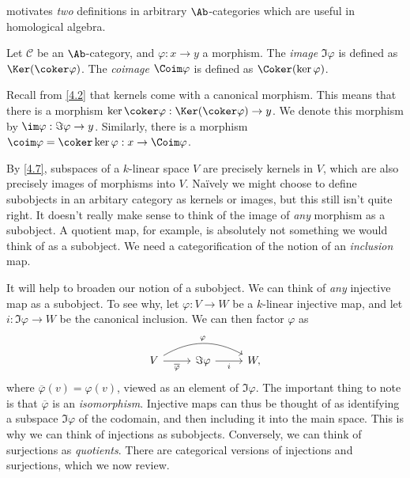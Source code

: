  motivates \emph{two} definitions in arbitrary $\Ab $-categories which are useful in homological algebra.

\begin{definition}\label{4.8}
	Let $\mathcal{C} $ be an $\Ab $-category, and $\varphi : x \to y$ a morphism. The \emph{image} $\Im \varphi $ is defined as $\Ker (\coker \varphi )$. The \emph{coimage} $\Coim \varphi $ is defined as $\Coker(\ker \varphi )$.
\end{definition}

\begin{remark}\label{4.9}
	Recall from \cref{4.2} that kernels come with a canonical morphism. This means that there is a morphism $\ker \coker \varphi : \Ker (\coker \varphi ) \to y$. We denote this morphism by $\im \varphi : \Im \varphi  \to y$. Similarly, there is a morphism $\coim \varphi =\coker \ker \varphi : x \to \Coim \varphi $.
\end{remark}

By \cref{4.7}, subspaces of a $k$-linear space $V$ are precisely kernels in $V$, which are also precisely images of morphisms into $V$. Na\"ively we might choose to define subobjects in an arbitary category as kernels or images, but this still isn't quite right. It doesn't really make sense to think of the image of \emph{any} morphism as a subobject. A quotient map, for example, is absolutely not something we would think of as a subobject. We need a categorification of the notion of an \emph{inclusion} map.

It will help to broaden our notion of a subobject. We can think of \emph{any} injective map as a subobject. To see why, let $\varphi : V \to W$ be a $k$-linear injective map, and let $i : \Im \varphi  \to W$ be the canonical inclusion. We can then factor $\varphi $ as
\[\begin{tikzcd}[row sep = 2.5em, column sep = 2.5em]
V \ar[" \varphi  ", bend left, rr] \ar[" \overline{\varphi }  "', r]  & \Im \varphi  \ar[" i "', r]  & W,
\end{tikzcd}\]
where $\overline{\varphi } (v)=\varphi (v)$, viewed as an element of $\Im \varphi $. The important thing to note is that $\overline{\varphi } $ is an \emph{isomorphism}. Injective maps can thus be thought of as identifying a subspace $\Im \varphi $ of the codomain, and then including it into the main space. This is why we can think of injections as subobjects. Conversely, we can think of surjections as \emph{quotients}. There are categorical versions of injections and surjections, which we now review.

